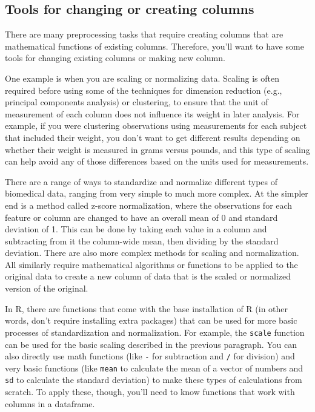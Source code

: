 \documentclass[]{tufte-book}
\begin{document}
\subsection{Tools for changing or creating columns}\label{tools-for-changing-or-creating-columns}

There are many preprocessing tasks that require creating columns that are
mathematical functions of existing columns. Therefore, you'll want to have some
tools for changing existing columns or making new column.

One example is when you are scaling or normalizing data. Scaling is often
required before using some of the techniques for dimension reduction (e.g.,
principal components analysis) or clustering, to ensure that the unit of
measurement of each column does not influence its weight in later analysis. For
example, if you were clustering observations using measurements for each subject
that included their weight, you don't want to get different results depending on
whether their weight is measured in grams versus pounds, and this type of
scaling can help avoid any of those differences based on the units used for
measurements.

There are a range of ways to standardize and normalize different types of
biomedical data, ranging from very simple to much more complex. At the simpler
end is a method called z-score normalization, where the observations for each
feature or column are changed to have an overall mean of 0 and standard
deviation of 1. This can be done by taking each value in a column and
subtracting from it the column-wide mean, then dividing by the standard
deviation. There are also more complex methods for scaling and normalization.
All similarly require mathematical algorithms or functions to be applied to the
original data to create a new column of data that is the scaled or normalized
version of the original.

In R, there are functions that come with the base installation of R (in other
words, don't require installing extra packages) that can be used for more basic
processes of standardization and normalization. For example, the \texttt{scale}
function can be used for the basic scaling described in the previous paragraph.
You can also directly use math functions (like \texttt{-} for subtraction and \texttt{/} for
division) and very basic functions (like \texttt{mean} to calculate the mean of a
vector of numbers and \texttt{sd} to calculate the standard deviation) to make these
types of calculations from scratch. To apply these, though, you'll need to know
functions that work with columns in a dataframe.
\end{document}
